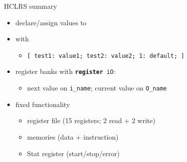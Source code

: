 \begin{frame}{HCLRS summary}
    \begin{itemize}
    \item declare/assign values to 
    \item {} with
        \begin{itemize}
        \item {\tt [ test1: value1; test2: value2; 1: default; ]}
        \end{itemize}
    \item register banks with {\tt \textbf{register} iO}:
        \begin{itemize}
        \item next value on {\tt i\_name}; current value on {\tt O\_name}
        \end{itemize}
    \item fixed functionality
        \begin{itemize}
        \item register file (15 registers; 2 read + 2 write)
        \item memories (data + instruction)
        \item Stat register (start/stop/error)
        \end{itemize}
    \end{itemize}
\end{frame}

